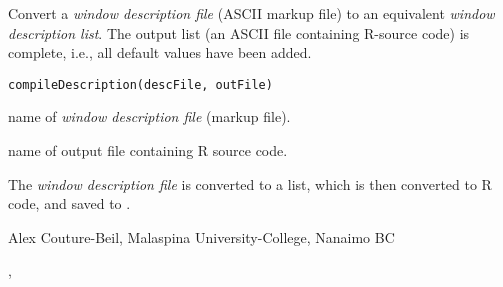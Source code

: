 \documentclass[letterpaper]{book}
\begin{document}
\begin{Description}\relax
Convert a \emph{window description file} (ASCII markup file) to an equivalent 
\emph{window description list}. The output list (an ASCII file containing R-source code) 
is complete, i.e., all default values have been added.
\end{Description}
\begin{Usage}
\begin{verbatim}compileDescription(descFile, outFile)\end{verbatim}
\end{Usage}
\begin{Arguments}
\begin{ldescription}
\item[\code{descFile}] name of \emph{window description file} (markup file).
\item[\code{outFile}] name of output file containing R source code.
\end{ldescription}
\end{Arguments}
\begin{Details}\relax
The \emph{window description file}  is converted to a list, 
which is then converted to R code, and saved to .
\end{Details}
\begin{Author}\relax
Alex Couture-Beil, Malaspina University-College, Nanaimo BC
\end{Author}
\begin{SeeAlso}\relax
{}, 
\end{SeeAlso}
\end{document}
